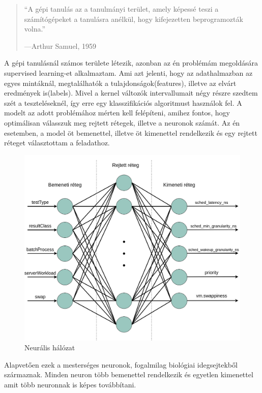 \begin{quote}
``A gépi tanulás az a tanulmányi terület, amely képessé teszi a számítógépeket a tanulásra
anélkül, hogy kifejezetten beprogramozták volna.''
\par\nobreak\smallskip\hfill—Arthur Samuel, 1959
\end{quote}

A gépi tanulásnál számos területe létezik, azonban az én problémám megoldására supervised learning-et alkalmaztam. Ami azt jelenti, hogy az adathalmazban az egyes mintáknál, megtalálhatók a tulajdonságok(features), illetve az elvárt eredmények is(labels).
Mivel a kernel változók intervallumait négy részre szedtem szét a teszteléseknél, így erre egy klasszifikációs algoritmust használok fel.
A modelt az adott problémához mérten kell felépíteni, amihez fontos, hogy optimálisan válasszuk meg rejtett rétegek, illetve a neuronok számát.
Az én esetemben, a model öt bemenettel, illetve öt kimenettel rendelkezik és egy rejtett réteget választottam a feladathoz.

\begin{figure}[h!]
\centering
\includegraphics[scale=0.3]{images/neuralNetwork.png}
\caption{Neurális hálózat}
\label{fig:neuralnetwork}
\end{figure}

Alapvetően ezek a mesterséges neuronok, fogalmilag biológiai idegsejtekből származnak.
Minden neuron több bemenettel rendelkezik és egyetlen kimenettel amit több neuronnak is képes továbbítani.

